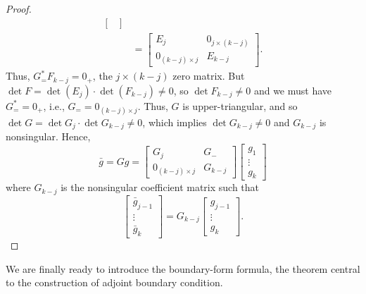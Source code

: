 \documentclass[11pt, oneside, a4paper]{article}
\begin{document}
\begin{proof}
\begin{align*}
\begin{bmatrix}
    \end{bmatrix}\\
    &= \begin{bmatrix}
        E_j & 0_{j\times (k-j)}\\
        0_{(k-j)\times j} & E_{k-j}
    \end{bmatrix}.
\end{align*}
Thus, $G^*_=F_{k-j}=0_+$, the $j\times (k-j)$ zero matrix. But $\det F = \det(E_j)\cdot \det(F_{k-j})\neq 0$, so $\det F_{k-j}\neq 0$ and we must have $G^*_==0_+$, i.e., $G_= =0_{(k-j)\times j}$. Thus, $G$ is upper-triangular, and so $\det G = \det G_j \cdot \det G_{k-j}\neq 0$, which implies $\det G_{k-j}\neq 0$ and $G_{k-j}$ is nonsingular. Hence,
\[\bar{g} = Gg = \begin{bmatrix}G_j & G_-\\
0_{(k-j)\times j} & G_{k-j}\end{bmatrix} \begin{bmatrix}
g_1\\
\vdots\\
g_k
\end{bmatrix}\]
where $G_{k-j}$ is the nonsingular coefficient matrix such that
\[\begin{bmatrix}
    \bar{g}_{j-1}\\
    \vdots\\
    \bar{g}_{k}
\end{bmatrix} = G_{k-j}\begin{bmatrix}
    g_{j-1}\\
    \vdots\\
    g_{k}
\end{bmatrix}.\]
\end{proof}

We are finally ready to introduce the boundary-form formula, the theorem central to the construction of adjoint boundary condition.
\end{document}
